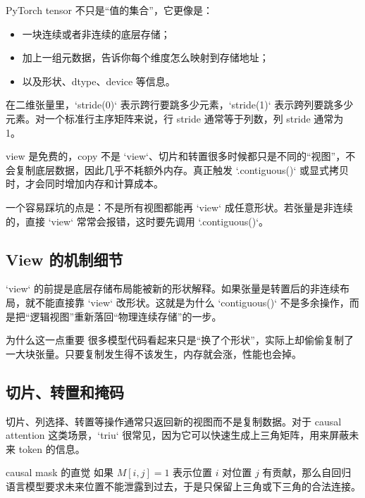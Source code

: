 PyTorch tensor 不只是“值的集合”，它更像是：
\begin{itemize}
    \item 一块连续或者非连续的底层存储；
    \item 加上一组元数据，告诉你每个维度怎么映射到存储地址；
    \item 以及形状、dtype、device 等信息。
\end{itemize}

在二维张量里，`stride(0)` 表示跨行要跳多少元素，`stride(1)` 表示跨列要跳多少元素。对一个标准行主序矩阵来说，行 stride 通常等于列数，列 stride 通常为 1。

\begin{importantbox}{view 是免费的，copy 不是}
`view`、切片和转置很多时候都只是不同的“视图”，不会复制底层数据，因此几乎不耗额外内存。真正触发 `.contiguous()` 或显式拷贝时，才会同时增加内存和计算成本。
\end{importantbox}

一个容易踩坑的点是：不是所有视图都能再 `view` 成任意形状。若张量是非连续的，直接 `view` 常常会报错，这时要先调用 `.contiguous()`。

\subsection{View 的机制细节}

`view` 的前提是底层存储布局能被新的形状解释。如果张量是转置后的非连续布局，就不能直接靠 `view` 改形状。这就是为什么 `contiguous()` 不是多余操作，而是把“逻辑视图”重新落回“物理连续存储”的一步。

\begin{warningbox}{为什么这一点重要}
很多模型代码看起来只是“换了个形状”，实际上却偷偷复制了一大块张量。只要复制发生得不该发生，内存就会涨，性能也会掉。
\end{warningbox}

\subsection{切片、转置和掩码}

切片、列选择、转置等操作通常只返回新的视图而不是复制数据。对于 causal attention 这类场景，`triu` 很常见，因为它可以快速生成上三角矩阵，用来屏蔽未来 token 的信息。

\begin{knowledgebox}{causal mask 的直觉}
如果 \(M[i,j]=1\) 表示位置 \(i\) 对位置 \(j\) 有贡献，那么自回归语言模型要求未来位置不能泄露到过去，于是只保留上三角或下三角的合法连接。
\end{knowledgebox}

